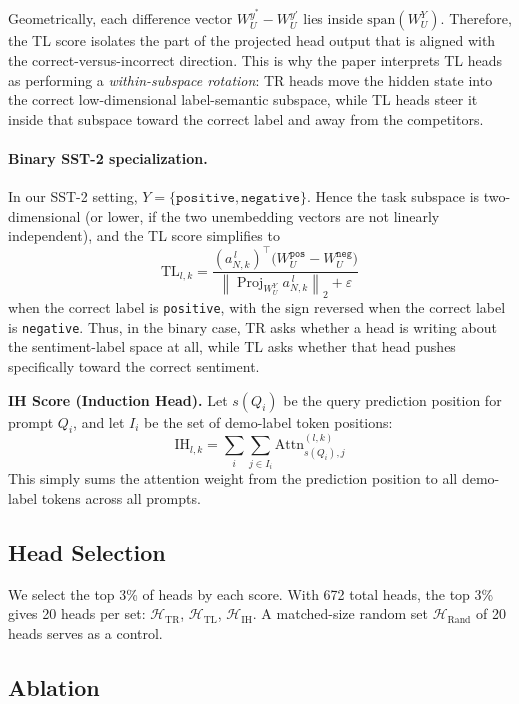 \documentclass[twoside,english]{article}
\begin{document}
Geometrically, each difference vector \(W_U^{y^*} - W_U^{y'}\) lies inside \(\mathrm{span}(W_U^Y)\). Therefore, the TL score isolates the part of the projected head output that is aligned with the correct-versus-incorrect direction. This is why the paper interprets TL heads as performing a \emph{within-subspace rotation}: TR heads move the hidden state into the correct low-dimensional label-semantic subspace, while TL heads steer it inside that subspace toward the correct label and away from the competitors.

\paragraph{Binary SST-2 specialization.}
In our SST-2 setting, \(Y = \{\texttt{positive}, \texttt{negative}\}\). Hence the task subspace is two-dimensional (or lower, if the two unembedding vectors are not linearly independent), and the TL score simplifies to
\[
\mathrm{TL}_{l,k}
=
\frac{
(a_{N,k}^{\,l})^\top \bigl(W_U^{\texttt{pos}} - W_U^{\texttt{neg}}\bigr)
}{
\left\|
\operatorname{Proj}_{W_U^Y} a_{N,k}^{\,l}
\right\|_2 + \varepsilon
}
\]
when the correct label is \texttt{positive}, with the sign reversed when the correct label is \texttt{negative}. Thus, in the binary case, TR asks whether a head is writing about the sentiment-label space at all, while TL asks whether that head pushes specifically toward the correct sentiment.

\textbf{IH Score (Induction Head).} Let $s(Q_i)$ be the query prediction position for prompt $Q_i$, and let $I_i$ be the set of demo-label token positions:
\begin{equation}
\mathrm{IH}_{l,k} = \sum_{i} \sum_{j \in I_i} \mathrm{Attn}^{(l,k)}_{s(Q_i), j}
\end{equation}
This simply sums the attention weight from the prediction position to all demo-label tokens across all prompts.

\subsection{Head Selection}

We select the top 3\% of heads by each score. With 672 total heads, the top 3\% gives 20 heads per set: $\mathcal{H}_{\text{TR}}$, $\mathcal{H}_{\text{TL}}$, $\mathcal{H}_{\text{IH}}$. A matched-size random set $\mathcal{H}_{\text{Rand}}$ of 20 heads serves as a control.

\subsection{Ablation}
\end{document}
